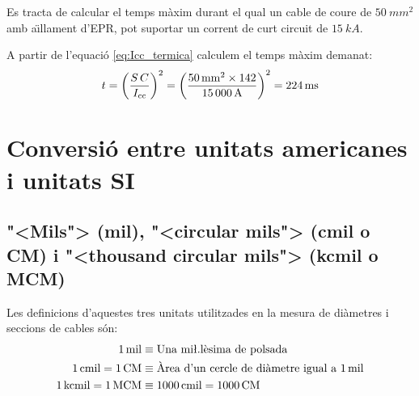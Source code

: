 \begin{exemple}
   Es tracta de calcular el temps m\`{a}xim durant el qual un cable de coure de $\SI{50}{mm^2}$ amb a\"{\i}llament d'EPR, pot suportar un corrent de curt circuit de $\SI{15}{kA}$.

A partir de l'equaci\'{o} \eqref{eq:Icc_termica} calculem el temps m\`{a}xim demanat:
\[
   t = \left( \frac{S\,C}{I_\mathrm{cc}} \right) ^2 = \left( \frac{\SI{50}{mm^2}\times 142}{\SI{15000}{A}} \right) ^2 = \SI{224}{ms}
\]
\end{exemple}

\section{Conversi\'{o} entre unitats americanes i unitats SI}

\subsection{{"<}Mils{">} (mil), {"<}circular mils{">} (cmil o CM) i {"<}thousand circular mils{">} (kcmil o MCM)}\label{sec:MCM}
  

  Les definicions d'aquestes tres unitats utilitzades en la mesura de di\`{a}metres i seccions de cables s\'{o}n:
\begin{align}
  \SI{1}{mil} &\equiv \text{Una mi{\l.l}\`{e}sima de polsada} \\
  \SI{1}{cmil} = \SI{1}{CM} &\equiv  \text{\`{A}rea d'un cercle de di\`{a}metre igual a \SI{1}{mil}} \\
  \SI{1}{kcmil} = \SI{1}{MCM} &\equiv \SI{1000}{cmil} = \SI{1000}{CM}
\end{align}

